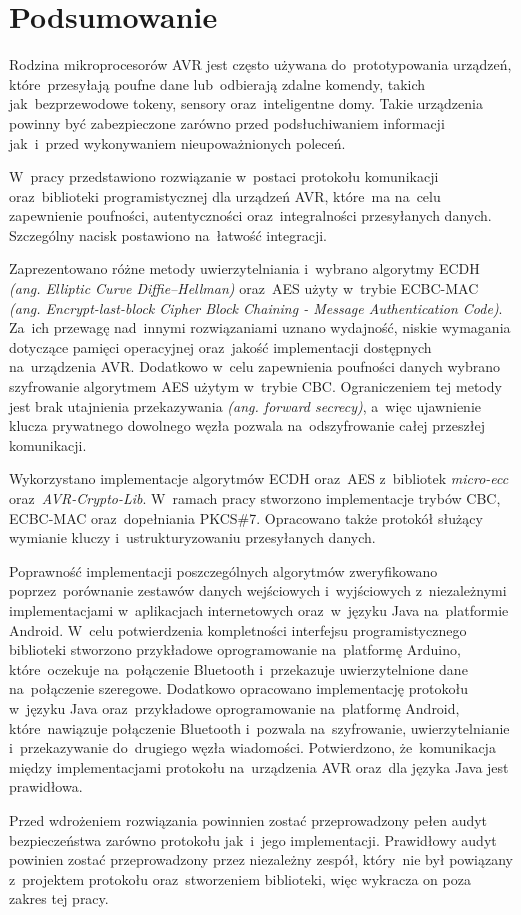 \chapter*{Podsumowanie}
\label{cha:podsumowanie}

Rodzina mikroprocesorów AVR jest często używana do~prototypowania urządzeń, które~przesyłają poufne dane lub~odbierają zdalne komendy, takich jak~bezprzewodowe tokeny, sensory oraz~inteligentne domy. Takie urządzenia powinny być zabezpieczone zarówno przed podsłuchiwaniem informacji jak~i~przed wykonywaniem nieupoważnionych poleceń.

W~pracy przedstawiono rozwiązanie w~postaci protokołu komunikacji oraz~biblioteki programistycznej dla urządzeń AVR, które~ma na~celu zapewnienie poufności, autentyczności oraz~integralności przesyłanych danych. Szczególny nacisk postawiono na~łatwość integracji.

Zaprezentowano różne metody uwierzytelniania i~wybrano algorytmy ECDH \emph{(ang. Elliptic Curve Diffie--Hellman)} oraz~AES użyty w~trybie ECBC-MAC \emph{(ang. Encrypt-last-block Cipher Block Chaining - Message Authentication Code)}. Za~ich przewagę nad~innymi rozwiązaniami uznano wydajność, niskie wymagania dotyczące pamięci operacyjnej oraz~jakość implementacji dostępnych na~urządzenia AVR. Dodatkowo w~celu zapewnienia poufności danych wybrano szyfrowanie algorytmem AES użytym w~trybie CBC. Ograniczeniem tej metody jest brak utajnienia przekazywania \emph{(ang. forward secrecy)}, a~więc ujawnienie klucza prywatnego dowolnego węzła pozwala na~odszyfrowanie całej przeszłej komunikacji.

Wykorzystano implementacje algorytmów ECDH oraz~AES z~bibliotek \emph{micro-ecc} oraz~\emph{AVR-Crypto-Lib}. W~ramach pracy stworzono implementacje trybów CBC, ECBC-MAC oraz~dopełniania PKCS\#7. Opracowano także protokół służący wymianie kluczy i~ustrukturyzowaniu przesyłanych danych.

Poprawność implementacji poszczególnych algorytmów zweryfikowano poprzez~porównanie zestawów danych wejściowych i~wyjściowych z~niezależnymi implementacjami w~aplikacjach internetowych oraz~w~języku Java na~platformie Android. W~celu potwierdzenia kompletności interfejsu programistycznego biblioteki stworzono przykładowe oprogramowanie na~platformę Arduino, które~oczekuje na~połączenie Bluetooth i~przekazuje uwierzytelnione dane na~połączenie szeregowe. Dodatkowo opracowano implementację protokołu w~języku Java oraz~przykładowe oprogramowanie na~platformę Android, które~nawiązuje połączenie Bluetooth i~pozwala na~szyfrowanie, uwierzytelnianie i~przekazywanie do~drugiego węzła wiadomości. Potwierdzono, że~komunikacja między implementacjami protokołu na~urządzenia AVR oraz~dla języka Java jest prawidłowa.

Przed wdrożeniem rozwiązania powinnien zostać przeprowadzony pełen audyt bezpieczeństwa zarówno protokołu jak~i~jego implementacji. Prawidłowy audyt powinien zostać przeprowadzony przez niezależny zespół, który~nie był powiązany z~projektem protokołu oraz~stworzeniem biblioteki, więc wykracza on poza zakres tej pracy.
